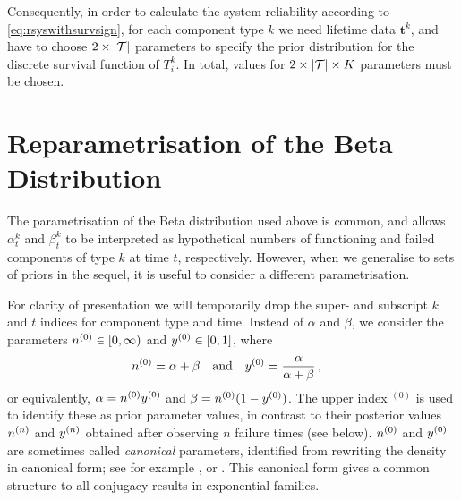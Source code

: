\documentclass[12pt, a4paper]{elsarticle}
\newcommand{\bs}[1]{\boldsymbol{#1}}
\renewcommand{\vec}[1]{{\bs#1}}
\newcommand{\uz}{^{(0)}} %
\begin{document}
Consequently, in order to calculate the system reliability according to \eqref{eq:rsyswithsurvsign},
for each component type $k$
we need lifetime data $\vec{t}^k$,
and have to choose $2 \times |{\cal T}|$ parameters
to specify the prior distribution for the discrete survival function of $T^k_i$.
In total, values for $2 \times |{\cal T}| \times K$ parameters must be chosen.


\section{Reparametrisation of the Beta Distribution}
\label{sec:reparam}

The parametrisation of the Beta distribution used above is common,
and allows $\alpha^k_t$ and $\beta^k_t$ to be interpreted as
hypothetical numbers of functioning and failed components of type $k$ at time $t$, respectively.
However, when we generalise to sets of priors in the sequel,
it is useful to consider a different parametrisation.

For clarity of presentation we will temporarily drop the super- and subscript $k$ and $t$ indices for component type and time.
Instead of $\alpha$ and $\beta$, we consider the parameters $\nz \in [0, \infty)$ and $\yz \in [0,1]$, where
\begin{align}
\nz &= \alpha + \beta &
&\text{and} &
\yz &= \frac{\alpha}{\alpha + \beta} \,,
\label{eq:reparam}
\end{align}
or equivalently, $\alpha = \nz\yz$ and $\beta = \nz(1-\yz)$.
The upper index ${}\uz$ is used to identify these as prior parameter values,
in contrast to their posterior values $n^{(n)}$ and $y^{(n)}$
obtained after observing $n$ failure times (see below).
$\nz$ and $\yz$ are sometimes called \emph{canonical} parameters,
identified from rewriting the density in canonical form;
see for example \cite[pp.~202 and 272f]{2000:bernardosmith}, or \cite[\S 1.2.3.1]{2013:diss-gw}.
This canonical form gives a common structure to all conjugacy results in exponential families.
\end{document}
